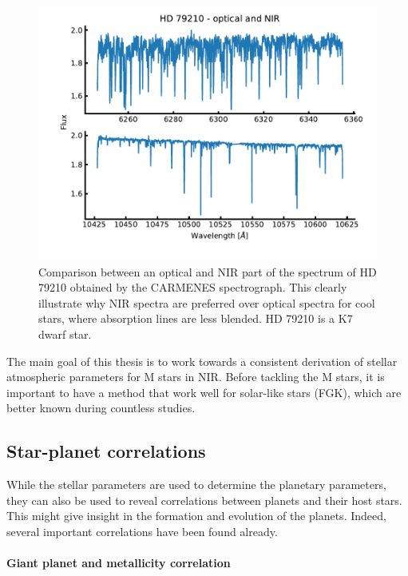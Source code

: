 \begin{figure}[htpb!]
    \centering
    \includegraphics[width=1.0\linewidth]{figures/opticalVSnir.pdf}
    \caption{Comparison between an optical and NIR part of the spectrum of HD 79210 obtained by
             the CARMENES spectrograph. This clearly illustrate why NIR spectra are preferred over
             optical spectra for cool stars, where absorption lines are less blended. HD 79210 is a
             K7 dwarf star.}
    \label{fig:opticalVSnir}
\end{figure}

The main goal of this thesis is to work towards a consistent derivation of stellar atmospheric
parameters for M stars in NIR. Before tackling the M stars, it is important to have a method that
work well for solar-like stars (FGK), which are better known during countless studies.

\subsection{Star-planet correlations}

While the stellar parameters are used to determine the planetary parameters, they can also be used
to reveal correlations between planets and their host stars. This might give insight in the
formation and evolution of the planets. Indeed, several important correlations have been found
already.

\paragraph{Giant planet and metallicity correlation}

